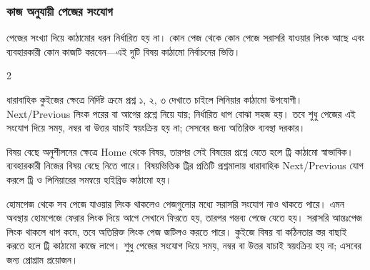 \subsubsection{কাজ অনুযায়ী পেজের সংযোগ}
পেজের সংখ্যা দিয়ে কাঠামোর ধরন নির্ধারিত হয় না। কোন পেজ থেকে কোন পেজে সরাসরি যাওয়ার লিংক আছে এবং ব্যবহারকারী কোন কাজটি করবেন—এই দুটি বিষয় কাঠামো নির্বাচনের ভিত্তি।

\begin{multicols}{2}
\noindent\begin{minipage}[t]{\linewidth}\vspace{0pt}
\begin{keypointbox}{ধারাবাহিক কুইজের ক্ষেত্রে}
নির্দিষ্ট ক্রমে প্রশ্ন ১, ২, ৩ দেখাতে চাইলে লিনিয়ার কাঠামো উপযোগী। Next/Previous লিংক পরের বা আগের প্রশ্নে নিয়ে যায়; নির্ধারিত ধাপ বোঝা সহজ হয়। তবে শুধু পেজের এই সংযোগ দিয়ে সময়, নম্বর বা উত্তর যাচাই স্বয়ংক্রিয় হয় না; সেসবের জন্য অতিরিক্ত ব্যবস্থা দরকার।
\end{keypointbox}
\end{minipage}\par
\noindent\begin{minipage}[t]{\linewidth}\vspace{0pt}
\begin{keypointbox}{বিষয় বেছে অনুশীলনের ক্ষেত্রে}
Home থেকে বিষয়, তারপর সেই বিষয়ের প্রশ্নে যেতে হলে ট্রি কাঠামো স্বাভাবিক। ব্যবহারকারী নিজের বিষয় বেছে নিতে পারে। বিষয়ভিত্তিক ট্রির প্রতিটি প্রশ্নমালায় ধারাবাহিক Next/Previous যোগ করলে ট্রি ও লিনিয়ারের সমন্বয়ে হাইব্রিড কাঠামো হয়।
\end{keypointbox}
\end{minipage}\par
\end{multicols}
হোমপেজ থেকে সব পেজে যাওয়ার লিংক থাকলেও পেজগুলোর মধ্যে সরাসরি সংযোগ নাও থাকতে পারে। এমন অবস্থায় হোমপেজে ফেরার লিংক দিয়ে আগে সেখানে ফিরতে হয়, তারপর গন্তব্য পেজে যেতে হয়। সরাসরি আন্তঃপেজ লিংক থাকলে ধাপ কমে, তবে অতিরিক্ত লিংক পেজ জটিলও করতে পারে। কুইজে বিষয় বা কঠিনতার স্তর বাছাই করতে হলে ট্রি কাঠামো কাজে লাগে। শুধু পেজের সংযোগ দিয়ে সময়, নম্বর বা উত্তর যাচাই স্বয়ংক্রিয় হয় না; এসবের জন্য প্রোগ্রাম প্রয়োজন।
